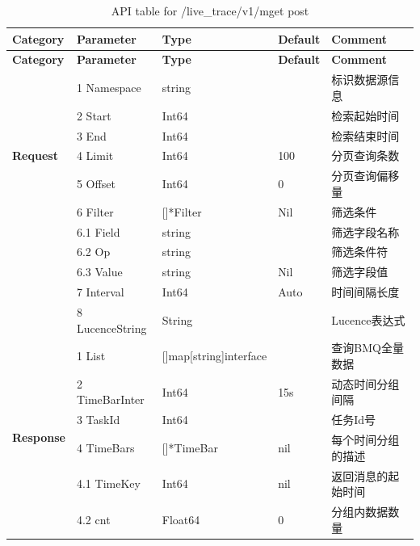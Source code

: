 \begin{longtable}{p{2cm}p{3cm}p{2cm}p{2cm}p{4cm}} 
\caption{API table for /live\_trace/v1/mget post} 
\toprule  
\textbf{Category} & \textbf{Parameter} & \textbf{Type} & \textbf{Default} & \textbf{Comment} \\ \midrule  
\endfirsthead  
  
\hline  
\toprule  
\textbf{Category} & \textbf{Parameter} & \textbf{Type} & \textbf{Default} & \textbf{Comment} \\ \midrule  
\endhead  
\multirow{7}{*}{\textbf{Request}} & {1} Namespace & string & & 标识数据源信息 \\  
& {2} Start & Int64 & & 检索起始时间 \\  
& {3} End & Int64 & & 检索结束时间 \\  
& {4} Limit & Int64 & 100 & 分页查询条数 \\  
& {5} Offset & Int64 & 0 & 分页查询偏移量 \\  
& {6} Filter & []*Filter & Nil & 筛选条件 \\  
& {  6.1} Field & string & & 筛选字段名称 \\  
& {  6.2} Op & string & & 筛选条件符 \\  
& {  6.3} Value & string & Nil & 筛选字段值 \\  
& {7} Interval & Int64 & Auto & 时间间隔长度 \\  
& {8} LucenceString & String & & Lucence表达式 \\
\multirow{6}{*}{\textbf{Response}} & {1} List & []map[string]interface{} & & 查询BMQ全量数据 \\  
&{2} TimeBarInter & Int64 & 15s & 动态时间分组间隔 \\  
&{3} TaskId & Int64 & & 任务Id号 \\  
& \multirow{1}{*}{4 TimeBars} & \multirow{1}{*}{[]*TimeBar} & \multirow{1}{*}{nil} & \multirow{1}{*}{每个时间分组的描述} \\ 
& {  4.1} TimeKey & Int64 & nil& 返回消息的起始时间 \\  
& {  4.2} cnt & Float64 &0& 分组内数据数量 \\  
\bottomrule  
\end{longtable} 
\vspace{1.5cm} %





